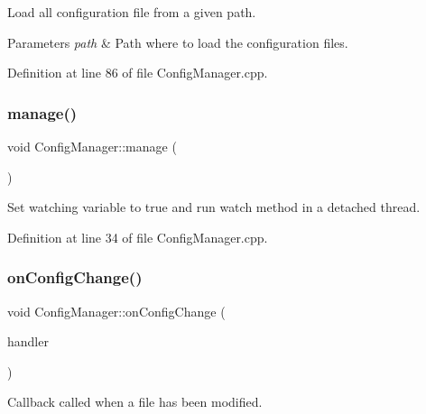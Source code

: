 Load all configuration file from a given path. 


\begin{DoxyParams}{Parameters}
{\em path} & Path where to load the configuration files. \\
\hline
\end{DoxyParams}


Definition at line 86 of file Config\+Manager.\+cpp.

\mbox{\label{classcfg_1_1_config_manager_addf0e3547d8e4d7dd023c17e43e8176d}} 
\subsubsection{\texorpdfstring{manage()}{manage()}}
{\footnotesize\ttfamily void Config\+Manager\+::manage (\begin{DoxyParamCaption}{ }\end{DoxyParamCaption})}



Set watching variable to true and run watch method in a detached thread. 



Definition at line 34 of file Config\+Manager.\+cpp.

\mbox{\label{classcfg_1_1_config_manager_a324ba63493aefb579500f7338bd477db}} 
\subsubsection{\texorpdfstring{on\+Config\+Change()}{onConfigChange()}}
{\footnotesize\ttfamily void Config\+Manager\+::on\+Config\+Change (\begin{DoxyParamCaption}\item[{\hyperlink{classcfg_1_1_config_manager_a6614f22d32db38ce6d6ed5b351d4f628}{Callback\+Handler} \&\&}]{handler }\end{DoxyParamCaption})}



Callback called when a file has been modified. 


